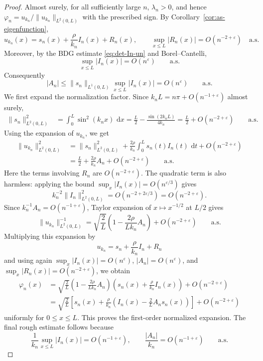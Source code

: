 \documentclass[11pt]{article}
\newcommand{\dd}{\,\mathrm d}
\begin{document}
\begin{proof}
Almost surely, for all sufficiently large \(n\), \(\lambda_n>0\), and hence \(\varphi_n=u_{k_n}/\|u_{k_n}\|_{L^2(0,L)}\) with the prescribed sign. By Corollary~\ref{cor:as-eigenfunction},
\[
    u_{k_n}(x)=s_n(x)+\frac{\rho}{k_n}I_n(x)+R_n(x),
    \qquad
    \sup_{x\le L}|R_n(x)|=O(n^{-2+\varepsilon})
    \quad\text{a.s.}
\]
Moreover, by the BDG estimate \eqref{eq:det-In-un} and Borel--Cantelli,
\[
    \sup_{x\le L}|I_n(x)|=O(n^{\varepsilon})
    \qquad\text{a.s.}
\]
Consequently
\[
    |A_n|
    \le \|s_n\|_{L^1(0,L)}\sup_{x\le L}|I_n(x)|
    =O(n^{\varepsilon})
    \qquad\text{a.s.}
\]
We first expand the normalization factor. Since \(k_nL=n\pi+O(n^{-1+\varepsilon})\) almost surely,
\[
\begin{aligned}
    \|s_n\|_{L^2(0,L)}^2
    &=\int_0^L\sin^2(k_nx)\,\dd x
      =\frac{L}{2}-\frac{\sin(2k_nL)}{4k_n}
      =\frac{L}{2}+O(n^{-2+\varepsilon})
      \qquad\text{a.s.}
\end{aligned}
\]
Using the expansion of \(u_{k_n}\), we get
\[
\begin{aligned}
\|u_{k_n}\|_{L^2(0,L)}^2
&=\|s_n\|_{L^2(0,L)}^2
+\frac{2\rho}{k_n}\int_0^L s_n(t)I_n(t)\,\dd t
+O(n^{-2+\varepsilon})  \\
&=\frac{L}{2}+\frac{2\rho}{k_n}A_n+O(n^{-2+\varepsilon})
\qquad\text{a.s.}
\end{aligned}
\]
Here the terms involving \(R_n\) are \(O(n^{-2+\varepsilon})\). The quadratic term is also harmless: applying the bound \(\sup_x|I_n(x)|=O(n^{\varepsilon/3})\) gives
\[
    k_n^{-2}\|I_n\|_{L^2(0,L)}^2=O(n^{-2+2\varepsilon/3})=O(n^{-2+\varepsilon}).
\]
Since \(k_n^{-1}A_n=O(n^{-1+\varepsilon})\), Taylor expansion of \(x\mapsto x^{-1/2}\) at \(L/2\) gives
\[
    \|u_{k_n}\|_{L^2(0,L)}^{-1}
    =\sqrt{\frac{2}{L}}
    \left(1-\frac{2\rho}{Lk_n}A_n\right)
    +O(n^{-2+\varepsilon})
    \qquad\text{a.s.}
\]
Multiplying this expansion by
\[
    u_{k_n}=s_n+\frac{\rho}{k_n}I_n+R_n
\]
and using again \(\sup_x |I_n(x)|=O(n^{\varepsilon})\), \(|A_n|=O(n^{\varepsilon})\), and \(\sup_x|R_n(x)|=O(n^{-2+\varepsilon})\), we obtain
\[
\begin{aligned}
\varphi_n(x)
&=\sqrt{\frac{2}{L}}
\left(1-\frac{2\rho}{Lk_n}A_n\right)
\left(s_n(x)+\frac{\rho}{k_n}I_n(x)\right)
+O(n^{-2+\varepsilon}) \\
&=\sqrt{\frac{2}{L}}
\left[
    s_n(x)+\frac{\rho}{k_n}
    \left(I_n(x)-\frac{2}{L}A_n s_n(x)\right)
\right]
+O(n^{-2+\varepsilon})
\end{aligned}
\]
uniformly for \(0\le x\le L\). This proves the first-order normalized expansion. The final rough estimate follows because
\[
    \frac{1}{k_n}\sup_{x\le L}|I_n(x)|=O(n^{-1+\varepsilon}),
    \qquad
    \frac{|A_n|}{k_n}=O(n^{-1+\varepsilon})
    \qquad\text{a.s.}
\]
\end{proof}
\end{document}
